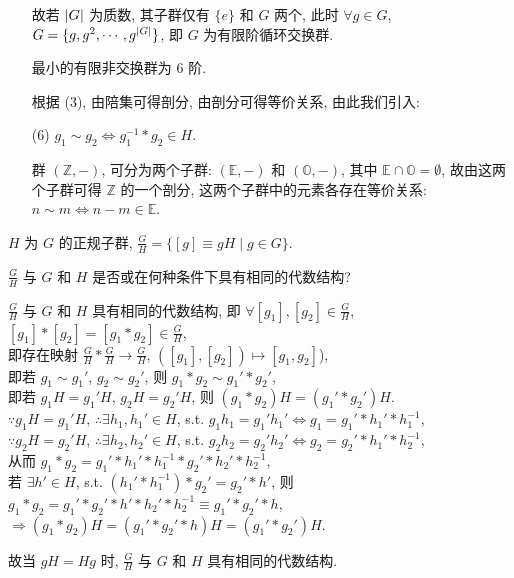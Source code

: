 \documentclass{note}
\begin{document}
\begin{itemize}
    故若 $\left\lvert G\right\rvert$ 为质数, 其子群仅有 $\{e\}$ 和 $G$ 两个, 此时 $\forall g\in G$, $G=\{g,g^2,\cdots,g^{\left\lvert G\right\rvert}\}$, 即 $G$ 为有限阶循环交换群.

    最小的有限非交换群为 $6$ 阶.

    根据 (3), 由陪集可得剖分, 由剖分可得等价关系, 由此我们引入:
    \item[(6)] $g_1\sim g_2\Longleftrightarrow g_1^{-1}*g_2\in H$.
    \begin{eg}
        群 $(\mathbb{Z},-)$, 可分为两个子群: $(\mathbb{E},-)$ 和 $(\mathbb{O},-)$, 其中 $\mathbb{E}\cap\mathbb{O}=\emptyset$, 故由这两个子群可得 $\mathbb{Z}$ 的一个剖分, 这两个子群中的元素各存在等价关系: $n\sim m\Longleftrightarrow n-m\in\mathbb{E}$.
    \end{eg}
\end{itemize}

\begin{df}[商群]
    $H$ 为 $G$ 的正规子群, $\frac{G}{H}=\{[g]\equiv gH\mid g\in G\}$.
\end{df}

\begin{prob}
    $\frac{G}{H}$ 与 $G$ 和 $H$ 是否或在何种条件下具有相同的代数结构?
\end{prob}
\begin{ans}
    $\frac{G}{H}$ 与 $G$ 和 $H$ 具有相同的代数结构, 即 $\forall[g_1],[g_2]\in\frac{G}{H}$, $[g_1]*[g_2]=[g_1*g_2]\in\frac{G}{H}$,\\
    即存在映射 $\frac{G}{H}*\frac{G}{H}\rightarrow\frac{G}{H}$, $([g_1],[g_2])\mapsto[g_1,g_2]$),\\
    即若 $g_1\sim g_1'$, $g_2\sim g_2'$, 则 $g_1*g_2\sim g_1'*g_2'$,\\
    即若 $g_1H=g_1'H$, $g_2H=g_2'H$, 则 $(g_1*g_2)H=(g_1'*g_2')H$.\\
    $\because g_1H=g_1'H$, $\therefore\exists h_1,h_1'\in H$, s.t. $g_1h_1=g_1'h_1'\Longleftrightarrow g_1=g_1'*h_1'*h_1^{-1}$,\\
    $\because g_2H=g_2'H$, $\therefore\exists h_2,h_2'\in H$, s.t. $g_2h_2=g_2'h_2'\Longleftrightarrow g_2=g_2'*h_1'*h_2^{-1}$,\\
    从而 $g_1*g_2=g_1'*h_1'*h_1^{-1}*g_2'*h_2'*h_2^{-1}$,\\
    若 $\exists h'\in H$, s.t. $(h_1'*h_1^{-1})*g_2'=g_2'*h'$, 则 $g_1*g_2=g_1'*g_2'*h'*h_2'*h_2^{-1}\equiv g_1'*g_2'*h$,\\
    $\Longrightarrow(g_1*g_2)H=(g_1'*g_2'*h)H=(g_1'*g_2')H$.

    故当 $gH=Hg$ 时, $\frac{G}{H}$ 与 $G$ 和 $H$ 具有相同的代数结构.
\end{ans}
\end{document}
